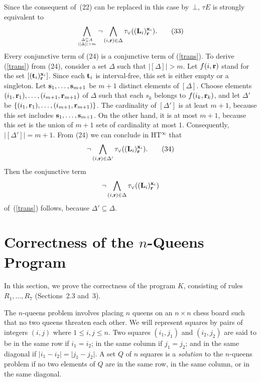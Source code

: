 \documentclass{tlp_mod}
\def\beq{\begin{equation}}
\def\eeq#1{\label{#1}\end{equation}}
\begin{document}
\begin{proof*}
Since the
consequent of~(22) can be replaced in this case by~$\bot$,
$\tau E$ is strongly equivalent to
\[
  \bigwedge_{\Delta \subseteq A \atop \lvert [\Delta] \rvert > m}  
  \neg \bigwedge_{(i, {\bf r}) \in\Delta} 
  \tau_{\lor}(({\bf L}_i)^{{\bf x}_i}_{\bf r}).
\tag{33}
\label{trans}
\]
Every conjunctive term of (24) is a conjunctive term of  
(\ref{trans}). To derive (\ref{trans}) from (24), consider a 
set $\Delta$ such that $\lvert [\Delta] \rvert > m$. 
Let $f(i,{\bf r})$ stand for the set
$[({\bf t}_i)^{{\bf x}_i}_{\bf r}]$. Since each ${\bf t}_i$ is 
interval-free, this set is either empty or a singleton. 
Let ${\bf s}_1,\dots,{\bf s}_{m+1}$ 
be $m+1$ distinct elements of $[\Delta]$.  
Choose elements $(i_1,{\bf r}_1),\dots,(i_{m+1},{\bf r}_{m+1})$ of 
$\Delta$ such that each $s_k$ belongs to $f(i_k,{\bf r}_k)$, and let 
$\Delta'$ be $\{(i_1,{\bf r}_1),\dots,(i_{m+1},{\bf r}_{m+1})\}$.
The cardinality of $[\Delta']$ is at least $m+1$, because this set 
includes ${\bf s}_1,\dots,{\bf s}_{m+1}$.  On the other hand, it is at 
most $m+1$, because this set is the union of $m+1$ sets of cardinality at 
most $1$.  
Consequently, $\lvert [\Delta']\rvert = m+1$.  From (24) 
we can conclude in HT\/$^\infty$ that  
\[
  \neg \bigwedge_{(i, {\bf r}) \in\Delta'} \tau_{\lor}
  (({\bf L}_i)^{{\bf x}_i}_{\bf r}).
\tag{34}
\label{cterm}
\]
Then the conjunctive term
$$\neg \bigwedge_{(i, {\bf r}) \in\Delta} 
  \tau_{\lor}(({\bf L}_i)^{{\bf x}_i}_{\bf r})$$
of~(\ref{trans}) follows, because $\Delta' \subseteq \Delta$.\end{proof*} 

\section*{Correctness of the $n$-Queens Program} \label{sec:nqueens}

In this section, we prove the correctness of the program $K$,
consisting of rules $R_1,\dots,R_7$ (Sections~2.3 and~3).

The $n$-queens problem involves placing $n$ queens on an $n \times n$ 
chess board such that no two queens threaten each other. We will represent 
squares by pairs of integers $(i, j)$ where 
\hbox{$1 \leq i,j \leq n$}. Two squares $(i_1, j_1)$ and $(i_2, j_2)$ are said 
to be in the same row if $i_1 = i_2$; in the same column
if $j_1 = j_2$; and in the same diagonal if $\lvert i_1 - i_2 \rvert = 
\lvert j_1 - j_2 \rvert$.
A set $Q$ of $n$ squares is a {\sl solution} to the $n$-queens problem if
no two elements of $Q$ are in the same row,  
in the same column, 
or in the same diagonal.
\end{document}
